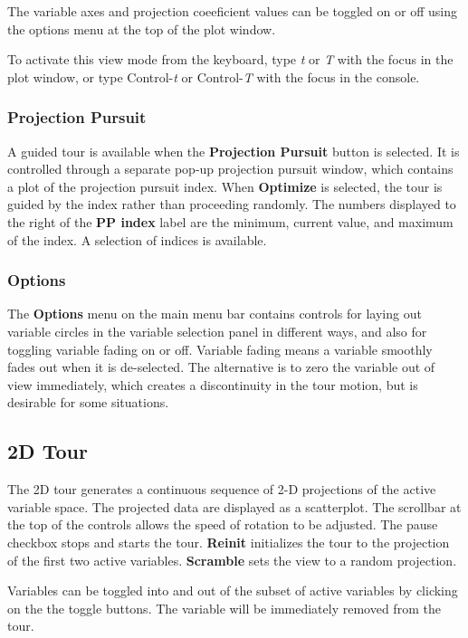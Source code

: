 \documentclass[11pt]{article}
\begin{document}
The variable axes and projection coeeficient values can be toggled on
or off using the options menu at the top of the plot window.

To activate this view mode from the keyboard, type {\em t} or {\em T}
with the focus in the plot window, or type Control-{\em t} or
Control-{\em T} with the focus in the console.

\subsubsection{Projection Pursuit}

A guided tour is available when the {\bf Projection Pursuit} button is
selected. It is controlled through a separate pop-up projection
pursuit window, which contains a plot of the projection pursuit index.
When {\bf Optimize} is selected, the tour is guided by the index
rather than proceeding randomly.  The numbers displayed to the right
of the {\bf PP index} label are the minimum, current value, and
maximum of the index.  A selection of indices is available.

\subsubsection{Options}

The {\bf Options} menu on the main menu bar contains controls for
laying out variable circles in the variable selection panel in
different ways, and also for toggling variable fading on or
off. Variable fading means a variable smoothly fades out when it is
de-selected. The alternative is to zero the variable out of view
immediately, which creates a discontinuity in the tour motion, but is
desirable for some situations.

\subsection{2D Tour}
\label{slbl:2DTour}

The 2D tour generates a continuous sequence of 2-D projections of the
active variable space. The projected data are displayed as a
scatterplot. The scrollbar at the top of the controls allows the speed
of rotation to be adjusted. The pause checkbox stops and starts the
tour. {\bf Reinit} initializes the tour to the projection of the first two
active variables. {\bf Scramble} sets the view to a random projection.

Variables can be toggled into and out of the subset of active
variables by clicking on the the toggle buttons. The variable will be
immediately removed from the tour. 
\end{document}
